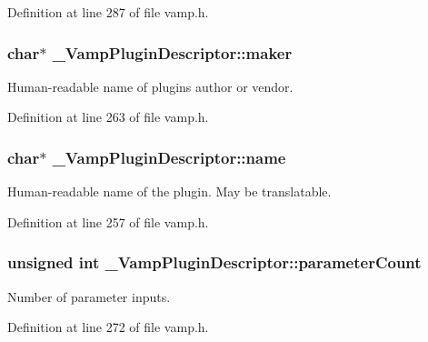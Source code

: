 Definition at line 287 of file vamp.\+h.

\subsubsection[{\texorpdfstring{maker}{maker}}]{ char$\ast$ \+\_\+\+Vamp\+Plugin\+Descriptor\+::maker}\hypertarget{struct___vamp_plugin_descriptor_a4dca3d57331802964716edfa80580c9b}{}\label{struct___vamp_plugin_descriptor_a4dca3d57331802964716edfa80580c9b}
Human-\/readable name of plugin\textquotesingle{}s author or vendor. 

Definition at line 263 of file vamp.\+h.

\subsubsection[{\texorpdfstring{name}{name}}]{ char$\ast$ \+\_\+\+Vamp\+Plugin\+Descriptor\+::name}\hypertarget{struct___vamp_plugin_descriptor_a9dd5a0190e4d453ff36b5acb7000b150}{}\label{struct___vamp_plugin_descriptor_a9dd5a0190e4d453ff36b5acb7000b150}
Human-\/readable name of the plugin. May be translatable. 

Definition at line 257 of file vamp.\+h.

\subsubsection[{\texorpdfstring{parameter\+Count}{parameterCount}}]{\setlength{\rightskip}{0pt plus 5cm}unsigned {\bf int} \+\_\+\+Vamp\+Plugin\+Descriptor\+::parameter\+Count}\hypertarget{struct___vamp_plugin_descriptor_ae6271dc3ea0cea959c84a64185492cab}{}\label{struct___vamp_plugin_descriptor_ae6271dc3ea0cea959c84a64185492cab}
Number of parameter inputs. 

Definition at line 272 of file vamp.\+h.

